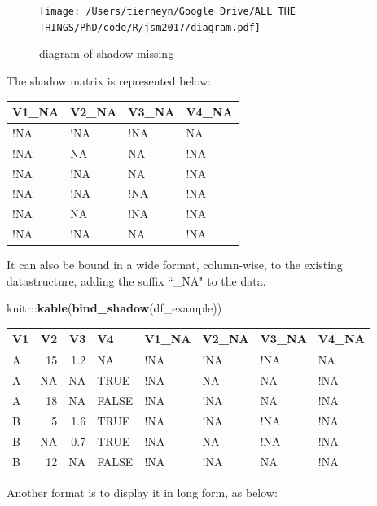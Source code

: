 \documentclass[]{article}
\newenvironment{Shaded}{\begin{snugshade}}{\end{snugshade}}
\newcommand{\KeywordTok}[1]{\textcolor[rgb]{0.13,0.29,0.53}{\textbf{{#1}}}}
\newcommand{\DataTypeTok}[1]{\textcolor[rgb]{0.13,0.29,0.53}{{#1}}}
\newcommand{\DecValTok}[1]{\textcolor[rgb]{0.00,0.00,0.81}{{#1}}}
\newcommand{\StringTok}[1]{\textcolor[rgb]{0.31,0.60,0.02}{{#1}}}
\newcommand{\NormalTok}[1]{{#1}}
\begin{document}
\begin{figure}[htbp]
\centering
\texttt{[image: /Users/tierneyn/Google Drive/ALL THE THINGS/PhD/code/R/jsm2017/diagram.pdf]}
\caption{diagram of shadow missing}
\end{figure}

The shadow matrix is represented below:

\begin{longtable}[]{@{}llll@{}}
\toprule
V1\_NA & V2\_NA & V3\_NA & V4\_NA\tabularnewline
\midrule
\endhead
!NA & !NA & !NA & NA\tabularnewline
!NA & NA & NA & !NA\tabularnewline
!NA & !NA & NA & !NA\tabularnewline
!NA & !NA & !NA & !NA\tabularnewline
!NA & NA & !NA & !NA\tabularnewline
!NA & !NA & NA & !NA\tabularnewline
\bottomrule
\end{longtable}

It can also be bound in a wide format, column-wise, to the existing
datastructure, adding the suffix ``\_NA" to the data.

\begin{Shaded}
\begin{Highlighting}[]
\NormalTok{knitr::}\KeywordTok{kable}\NormalTok{(}\KeywordTok{bind_shadow}\NormalTok{(df_example))}
\end{Highlighting}
\end{Shaded}

\begin{longtable}[]{@{}lrrlllll@{}}
\toprule
V1 & V2 & V3 & V4 & V1\_NA & V2\_NA & V3\_NA & V4\_NA\tabularnewline
\midrule
\endhead
A & 15 & 1.2 & NA & !NA & !NA & !NA & NA\tabularnewline
A & NA & NA & TRUE & !NA & NA & NA & !NA\tabularnewline
A & 18 & NA & FALSE & !NA & !NA & NA & !NA\tabularnewline
B & 5 & 1.6 & TRUE & !NA & !NA & !NA & !NA\tabularnewline
B & NA & 0.7 & TRUE & !NA & NA & !NA & !NA\tabularnewline
B & 12 & NA & FALSE & !NA & !NA & NA & !NA\tabularnewline
\bottomrule
\end{longtable}

Another format is to display it in long form, as below:

\begin{Shaded}
\end{Shaded}
\end{document}
